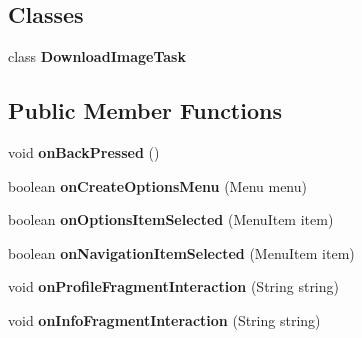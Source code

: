 \subsection*{\-Classes}
\begin{DoxyCompactItemize}
\item 
class {\bfseries \-Download\-Image\-Task}
\end{DoxyCompactItemize}
\subsection*{\-Public \-Member \-Functions}
\begin{DoxyCompactItemize}
\item 
\hypertarget{classcom_1_1example_1_1sel_1_1lostfound_1_1FeedActivity_a92ef1347dacbec013be0cc6eaf19e680}{void {\bfseries on\-Back\-Pressed} ()}\label{classcom_1_1example_1_1sel_1_1lostfound_1_1FeedActivity_a92ef1347dacbec013be0cc6eaf19e680}

\item 
\hypertarget{classcom_1_1example_1_1sel_1_1lostfound_1_1FeedActivity_a11b2b6ec46e07d2248259b101dd4f699}{boolean {\bfseries on\-Create\-Options\-Menu} (\-Menu menu)}\label{classcom_1_1example_1_1sel_1_1lostfound_1_1FeedActivity_a11b2b6ec46e07d2248259b101dd4f699}

\item 
\hypertarget{classcom_1_1example_1_1sel_1_1lostfound_1_1FeedActivity_a30ac1d8cd6a1f8f4a17546f894ee0150}{boolean {\bfseries on\-Options\-Item\-Selected} (\-Menu\-Item item)}\label{classcom_1_1example_1_1sel_1_1lostfound_1_1FeedActivity_a30ac1d8cd6a1f8f4a17546f894ee0150}

\item 
\hypertarget{classcom_1_1example_1_1sel_1_1lostfound_1_1FeedActivity_ac1e5f59e54f8b0adfcfcd7999c7d5d3d}{boolean {\bfseries on\-Navigation\-Item\-Selected} (\-Menu\-Item item)}\label{classcom_1_1example_1_1sel_1_1lostfound_1_1FeedActivity_ac1e5f59e54f8b0adfcfcd7999c7d5d3d}

\item 
\hypertarget{classcom_1_1example_1_1sel_1_1lostfound_1_1FeedActivity_a7dab67bae2a8451acea819995f6e10b8}{void {\bfseries on\-Profile\-Fragment\-Interaction} (\-String string)}\label{classcom_1_1example_1_1sel_1_1lostfound_1_1FeedActivity_a7dab67bae2a8451acea819995f6e10b8}

\item 
\hypertarget{classcom_1_1example_1_1sel_1_1lostfound_1_1FeedActivity_a4d16fc6e0aa78d30aa10142e5e2584ac}{void {\bfseries on\-Info\-Fragment\-Interaction} (\-String string)}\label{classcom_1_1example_1_1sel_1_1lostfound_1_1FeedActivity_a4d16fc6e0aa78d30aa10142e5e2584ac}


\end{DoxyCompactItemize}

